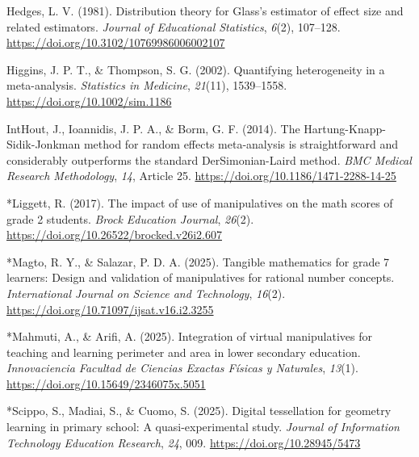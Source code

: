 \documentclass[man,a4paper,12pt,floatsintext,nolmodern,notab]{apa7}
\begin{document}
\par\noindent\hangindent=0.5in Hedges, L. V. (1981). Distribution theory for Glass's estimator of effect size and related estimators. \textit{Journal of Educational Statistics}, \textit{6}(2), 107–128. \url{https://doi.org/10.3102/10769986006002107}\par
\par\noindent\hangindent=0.5in Higgins, J. P. T., \& Thompson, S. G. (2002). Quantifying heterogeneity in a meta-analysis. \textit{Statistics in Medicine}, \textit{21}(11), 1539–1558. \url{https://doi.org/10.1002/sim.1186}\par
\par\noindent\hangindent=0.5in IntHout, J., Ioannidis, J. P. A., \& Borm, G. F. (2014). The Hartung-Knapp-Sidik-Jonkman method for random effects meta-analysis is straightforward and considerably outperforms the standard DerSimonian-Laird method. \textit{BMC Medical Research Methodology}, \textit{14}, Article 25. \url{https://doi.org/10.1186/1471-2288-14-25}\par
\par\noindent\hangindent=0.5in *Liggett, R. (2017). The impact of use of manipulatives on the math scores of grade 2 students. \textit{Brock Education Journal}, \textit{26}(2). \url{https://doi.org/10.26522/brocked.v26i2.607}\par
\par\noindent\hangindent=0.5in *Magto, R. Y., \& Salazar, P.  D. A. (2025). Tangible mathematics for grade 7 learners: Design and validation of manipulatives for rational number concepts. \textit{International Journal on Science and Technology}, \textit{16}(2). \url{https://doi.org/10.71097/ijsat.v16.i2.3255}\par
\par\noindent\hangindent=0.5in *Mahmuti, A., \& Arifi, A. (2025). Integration of virtual manipulatives for teaching and learning perimeter and area in lower secondary education. \textit{Innovaciencia Facultad de Ciencias Exactas Físicas y Naturales}, \textit{13}(1). \url{https://doi.org/10.15649/2346075x.5051}\par
\par\noindent\hangindent=0.5in *Scippo, S., Madiai, S., \& Cuomo, S. (2025). Digital tessellation for geometry learning in primary school: A quasi-experimental study. \textit{Journal of Information Technology Education Research}, \textit{24}, 009. \url{https://doi.org/10.28945/5473}\par
\end{document}
